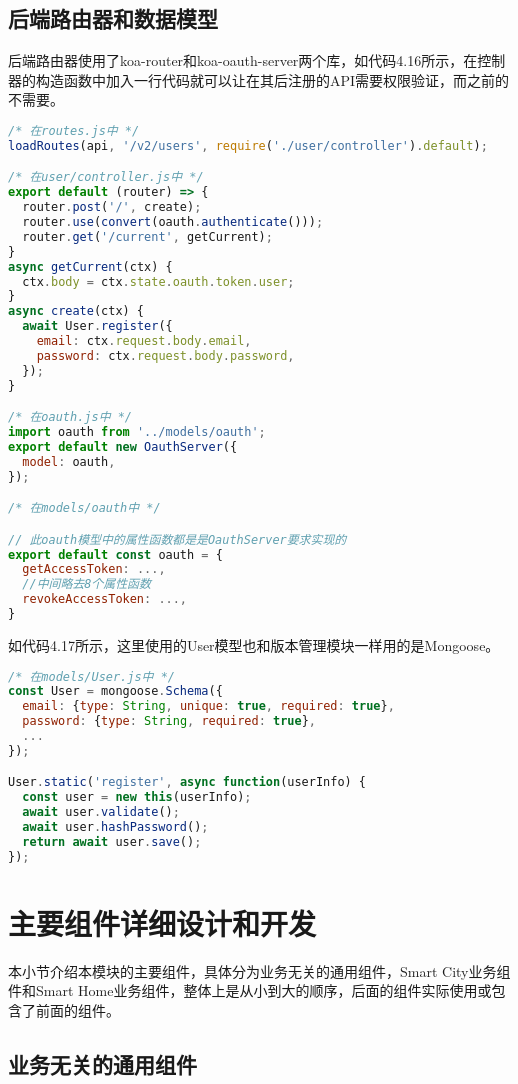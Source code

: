 \subsection{后端路由器和数据模型}
后端路由器使用了koa-router和koa-oauth-server两个库，如代码4.16所示，在控制器的构造函数中加入一行代码就可以让在其后注册的API需要权限验证，而之前的不需要。
\begin{lstlisting}[language={JavaScript}, caption={Smart City和Smart Home模块后端权限控制相关代码}]
/* 在routes.js中 */
loadRoutes(api, '/v2/users', require('./user/controller').default);

/* 在user/controller.js中 */
export default (router) => {
  router.post('/', create);
  router.use(convert(oauth.authenticate()));
  router.get('/current', getCurrent);
}
async getCurrent(ctx) {
  ctx.body = ctx.state.oauth.token.user;
}
async create(ctx) {
  await User.register({
    email: ctx.request.body.email,
    password: ctx.request.body.password,
  });
}

/* 在oauth.js中 */
import oauth from '../models/oauth';
export default new OauthServer({
  model: oauth,
});

/* 在models/oauth中 */

// 此oauth模型中的属性函数都是是OauthServer要求实现的
export default const oauth = {
  getAccessToken: ...,
  //中间略去8个属性函数
  revokeAccessToken: ...,
}
\end{lstlisting}

如代码4.17所示，这里使用的User模型也和版本管理模块一样用的是Mongoose。
\begin{lstlisting}[language={JavaScript}, caption={Smart City和Smart Home模块后端User模型}]
/* 在models/User.js中 */
const User = mongoose.Schema({
  email: {type: String, unique: true, required: true},
  password: {type: String, required: true},
  ...
});

User.static('register', async function(userInfo) {
  const user = new this(userInfo);
  await user.validate();
  await user.hashPassword();
  return await user.save();
});
\end{lstlisting}

\section{主要组件详细设计和开发}
本小节介绍本模块的主要组件，具体分为业务无关的通用组件，Smart City业务组件和Smart Home业务组件，整体上是从小到大的顺序，后面的组件实际使用或包含了前面的组件。
\subsection{业务无关的通用组件}
